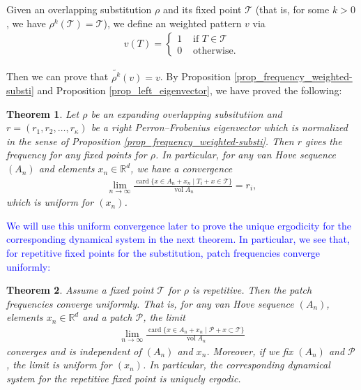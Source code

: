 \documentclass[a4]{amsart}
\DeclareMathOperator{\vol}{vol}
\DeclareMathOperator{\card}{card}
\newtheorem{theorem}{Theorem}[section]
\theoremstyle{definition}
\begin{document}
Given an overlapping  substitution $\rho$ and its fixed point $\mathcal{T}$ (that is, for some
$k>0$, we have $\rho^k(\mathcal{T})=\mathcal{T}$), we define an weighted pattern $v$ via
\begin{align*}
 v(T)=
\begin{cases}
 1 &\text{ if $T\in\mathcal{T}$}\\
0 & \text{ otherwise}.
\end{cases}
\end{align*}

Then we can prove that $\tilde{\rho^k}(v)=v$. By Proposition \ref{prop_frequency_weighted-substi} and Proposition \ref{prop_left_eigenvector}, we have proved the following:

\begin{theorem}\label{thm_uniform_tile_freq}
 Let $\rho$ be an expanding overlapping subsitutiion and $r=(r_1,r_2,\ldots, r_{\kappa})$ be
a right Perron--Frobenius eigenvector which is normalized in the sense of 
Proposition \ref{prop_frequency_weighted-substi}. Then $r$ gives the frequency for any fixed points for $\rho$.
In particular, for any van Hove sequence $(A_n)$ and elements $x_n\in\mathbb{R}^d$, we have
a convergence
\begin{align*}
      \lim_{n\rightarrow\infty}\frac{\card\{x\in A_n+x_n\mid T_i+x\in\mathcal{T}\}}{\vol{A_n}}=r_i,
\end{align*}
which is uniform for $(x_n)$.
\end{theorem}

\textcolor{blue}{
We will use this uniform convergence later to prove the unique ergodicity for the corresponding dynamical system in the next theorem.
In particular, we see that, for repetitive fixed points for the substitution, patch frequencies converge uniformly:}
\begin{theorem}\label{thm_uniform_patch_freq}
    Assume a fixed point $\mathcal{{T}}$ for $\rho$ is repetitive. Then the patch frequencies converge uniformly. That is, 
    for any van Hove sequence $(A_n)$,
    elements $x_n\in\mathbb{R}^d$
    and a patch $\mathcal{{P}}$, the
    limit
    \begin{align*}
    \lim_{n\rightarrow\infty}\frac{\card\{x\in A_n+x_n\mid \mathcal{P}+x\subset\mathcal{T}\}}{\vol A_n}
    \end{align*}
    converges and is independent of $(A_n)$ and $x_n$.
    Moreover, if we fix $(A_n)$ and $\mathcal{P}$, the limit is uniform for $(x_n)$.
    In particular, the corresponding dynamical system for the repetitive fixed point is uniquely ergodic.
\end{theorem}
\end{document}
